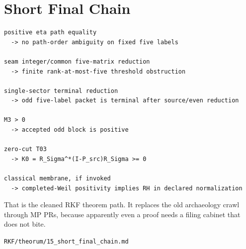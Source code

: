 \hypertarget{short-final-chain}{%
\chapter{Short Final Chain}\label{short-final-chain}}

\begin{verbatim}
positive eta path equality
  -> no path-order ambiguity on fixed five labels

seam integer/common five-matrix reduction
  -> finite rank-at-most-five threshold obstruction

single-sector terminal reduction
  -> odd five-label packet is terminal after source/even reduction

M3 > 0
  -> accepted odd block is positive

zero-cut T03
  -> K0 = R_Sigma^*(I-P_src)R_Sigma >= 0

classical membrane, if invoked
  -> completed-Weil positivity implies RH in declared normalization
\end{verbatim}

That is the cleaned RKF theorem path. It replaces the old archaeology crawl through MP PRs, because apparently even a proof needs a filing cabinet that does not bite.

\begin{flushright}\small\texttt{RKF/theorum/15\_short\_final\_chain.md}\end{flushright}
